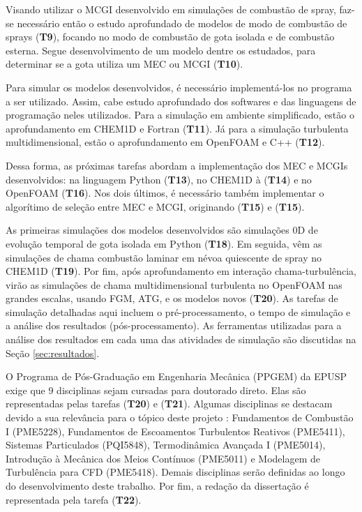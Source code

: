 Visando utilizar o MCGI desenvolvido em simulações de combustão de spray, faz-se necessário então o estudo aprofundado de modelos de modo de combustão de sprays (\textbf{T9}), focando no modo de combustão de gota isolada e de combustão esterna. Segue desenvolvimento de um modelo dentre os estudados, para determinar se a gota utiliza um MEC ou MCGI (\textbf{T10}).

Para simular os modelos desenvolvidos, é necessário implementá-los no programa a ser utilizado.
Assim, cabe estudo aprofundado dos softwares e das linguagens de programação neles utilizados. 
Para a simulação em ambiente simplificado, estão o aprofundamento em CHEM1D e Fortran (\textbf{T11}). Já para a simulação turbulenta multidimensional, estão o aprofundamento em OpenFOAM e C++ (\textbf{T12}).

Dessa forma, as próximas tarefas abordam a implementação dos MEC e MCGIs desenvolvidos: na linguagem Python  (\textbf{T13}), no  CHEM1D à  (\textbf{T14}) e no OpenFOAM  (\textbf{T16}).
Nos dois últimos, é necessário também implementar o algorítimo de seleção entre MEC e MCGI, originando (\textbf{T15}) e (\textbf{T15}).  

As primeiras simulações dos modelos desenvolvidos são simulações 0D de evolução temporal de gota isolada em Python (\textbf{T18}). 
Em seguida, vêm as simulações de chama combustão laminar em névoa quiescente de spray no CHEM1D (\textbf{T19}).
Por fim, após aprofundamento em interação chama-turbulência, virão as simulações de chama multidimensional turbulenta no OpenFOAM nas grandes escalas, usando FGM, ATG, e os modelos novos (\textbf{T20}).
As tarefas de simulação detalhadas aqui incluem o pré-processamento, o tempo de simulação e a análise dos resultados (pós-processamento).
As ferramentas utilizadas para a análise dos resultados em cada uma das atividades de simulação são discutidas na Seção \ref{sec:resultados}.

O Programa de Pós-Graduação em Engenharia Mecânica (PPGEM) da EPUSP exige que 9 disciplinas sejam cursadas para doutorado direto.
Elas são representadas pelas tarefas (\textbf{T20}) e (\textbf{T21}).
Algumas disciplinas se destacam devido a sua relevância para o tópico deste projeto : Fundamentos de Combustão I (PME5228), Fundamentos de Escoamentos Turbulentos Reativos  (PME5411), Sistemas Particulados (PQI5848), Termodinâmica Avançada I (PME5014), Introdução à Mecânica dos Meios Contínuos (PME5011) e Modelagem de Turbulência para CFD (PME5418).
Demais disciplinas serão definidas ao longo do desenvolvimento deste trabalho.
Por fim, a redação da dissertação é representada pela tarefa (\textbf{T22}).



